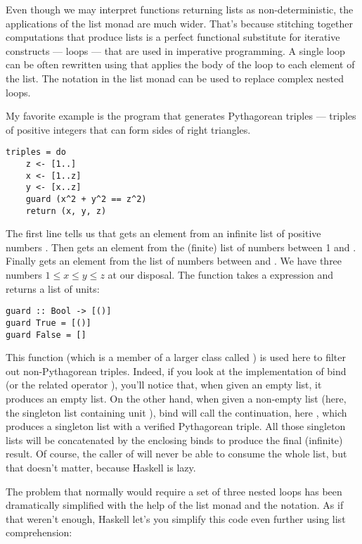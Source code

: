 Even though we may interpret functions returning lists as
non-deterministic, the applications of the list monad are much wider.
That's because stitching together computations that produce lists is a
perfect functional substitute for iterative constructs --- loops ---
that are used in imperative programming. A single loop can be often
rewritten using  that applies the body of the loop to each
element of the list. The  notation in the list monad can be
used to replace complex nested loops.

My favorite example is the program that generates Pythagorean triples
--- triples of positive integers that can form sides of right triangles.

\begin{Verbatim}
triples = do
    z <- [1..]
    x <- [1..z]
    y <- [x..z]
    guard (x^2 + y^2 == z^2)
    return (x, y, z)
\end{Verbatim}
The first line tells us that  gets an element from an infinite
list of positive numbers \code{{[}1..{]}}. Then  gets an
element from the (finite) list \code{{[}1..z{]}} of numbers between 1
and . Finally  gets an element from the list of
numbers between  and . We have three numbers
$1 \leqslant x \leqslant y \leqslant z$ at our
disposal. The function  takes a  expression
and returns a list of units:

\begin{Verbatim}
guard :: Bool -> [()]
guard True = [()]
guard False = []
\end{Verbatim}
This function (which is a member of a larger class called
) is used here to filter out non-Pythagorean triples.
Indeed, if you look at the implementation of bind (or the related
operator \code{>>}), you'll notice that,
when given an empty list, it produces an empty list. On the other hand,
when given a non-empty list (here, the singleton list containing unit
\code{{[}(){]}}), bind will call the continuation, here
, which produces a singleton list with a
verified Pythagorean triple. All those singleton lists will be
concatenated by the enclosing binds to produce the final (infinite)
result. Of course, the caller of  will never be able to
consume the whole list, but that doesn't matter, because Haskell is
lazy.

The problem that normally would require a set of three nested loops has
been dramatically simplified with the help of the list monad and the
 notation. As if that weren't enough, Haskell let's you
simplify this code even further using list comprehension:

